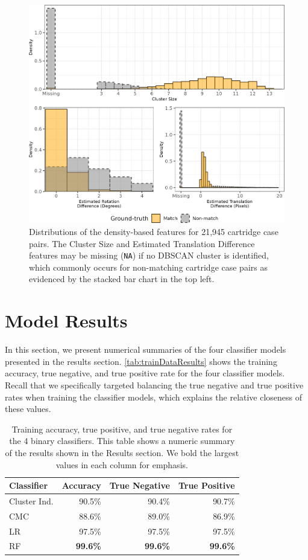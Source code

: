 \documentclass[reprint]{JASA}
\begin{document}
\begin{appendices}
\begin{figure}[htbp]
\includegraphics[width=.5\textwidth]{images/resultsPlots/featureDensity_densityBased} \caption{Distributions of the density-based features for 21,945 cartridge case pairs. The Cluster Size and Estimated Translation Difference features may be missing (\texttt{NA}) if no DBSCAN cluster is identified, which commonly occurs for non-matching cartridge case pairs as evidenced by the stacked bar chart in the top left.}\label{fig:densityDistributions}
\end{figure}

\section{Model Results}

In this section, we present numerical summaries of the four classifier models presented in the results section.
\autoref{tab:trainDataResults} shows the training accuracy, true negative, and true positive rate for the four classifier models.
Recall that we specifically targeted balancing the true negative and true positive rates when training the classifier models, which explains the relative closeness of these values.

\begin{table}[htbp]
    \centering
    \begin{tabular}{l|r|r|r}
         \textbf{Classifier} & \textbf{Accuracy} & \textbf{True Negative} & \textbf{True Positive} \\
         \hline
         Cluster Ind. & 90.5\% & 90.4\% & 90.7\% \\
         CMC & 88.6\% & 89.0\% & 86.9\% \\
         \hline
         LR & 97.5\% & 97.5\% & 97.5\% \\
         RF & \textbf{99.6\%} & \textbf{99.6\%} & \textbf{99.6\%}
    \end{tabular}
    \caption{Training accuracy, true positive, and true negative rates for the 4 binary classifiers. This table shows a numeric summary of the results shown in the Results section. We bold the largest values in each column for emphasis.}
    \label{tab:trainDataResults}
\end{table}


\end{appendices}
\end{document}
